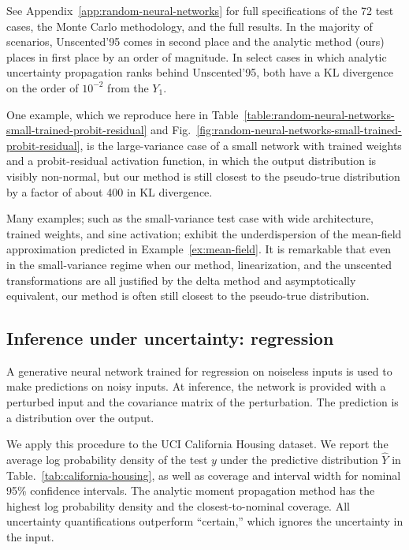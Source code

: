 \documentclass{article}
\begin{document}
See Appendix~\ref{app:random-neural-networks} for full specifications of the 72 test cases, the Monte Carlo methodology, and the full results.
In the majority of scenarios, Unscented'95 comes in second place and the analytic method (ours) places in first place by an order of magnitude.
In select cases in which analytic uncertainty propagation ranks behind Unscented'95, both have a KL divergence on the order of \(10^{-2}\) from the \(Y_1\).

One example, which we reproduce here in Table~\ref{table:random-neural-networks-small-trained-probit-residual} and Fig.~\ref{fig:random-neural-networks-small-trained-probit-residual}, is the large-variance case of a small network with trained weights and a probit-residual activation function, in which the output distribution is visibly non-normal, but our method is still closest to the pseudo-true distribution by a factor of about 400 in KL divergence.

Many examples; such as the small-variance test case with wide architecture, trained weights, and sine activation; exhibit the underdispersion of the mean-field approximation predicted in Example~\ref{ex:mean-field}.
It is remarkable that even in the small-variance regime when our method, linearization, and the unscented transformations are all justified by the delta method and asymptotically equivalent, our method is often still closest to the pseudo-true distribution.


\subsection{Inference under uncertainty: regression}
\label{sec:california-housing}
A generative neural network trained for regression on noiseless inputs is used to make predictions on noisy inputs.
At inference, the network is provided with a perturbed input and the covariance matrix of the perturbation.
The prediction is a distribution over the output.

We apply this procedure to the UCI California Housing dataset.
We report the average log probability density of the test \(y\) under the predictive distribution \(\hat Y\) in Table.~\ref{tab:california-housing}, as well as coverage and interval width for nominal 95\% confidence intervals.
The analytic moment propagation method  has the highest log probability density and the closest-to-nominal coverage.
All uncertainty quantifications outperform ``certain,'' which ignores the uncertainty in the input.
\end{document}
